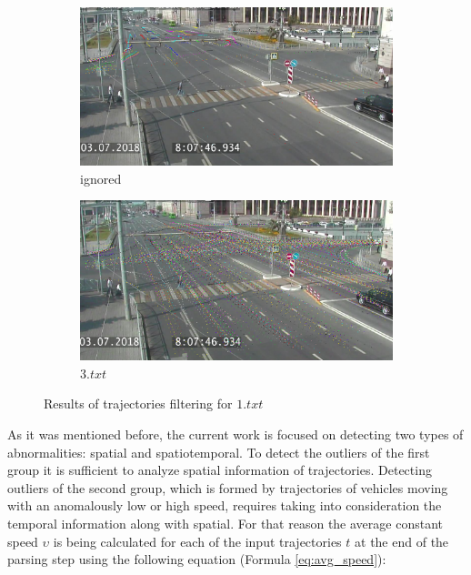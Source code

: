 \begin{figure}
	\centering
	\begin{subfigure}[b]{0.48\textwidth}
		\centering{}
		\includegraphics[width=\textwidth]{images/traj-filter-out.png}
		\caption{ignored}
		\label{fig:traj_filter_out}
	\end{subfigure}
	\hfill
	\begin{subfigure}[b]{0.48\textwidth}
		\centering{}
		\includegraphics[width=\textwidth]{images/traj-filter-keep.png}
		\caption{$3.txt$}
		\label{fig:traj_filter_keep}
	\end{subfigure}
	\caption{Results of trajectories filtering for $1.txt$}
	\label{fig:traj_filter}
\end{figure}

As it was mentioned before, the current work is focused on detecting two types of abnormalities: spatial and spatiotemporal. To detect the outliers of the first group it is sufficient to analyze spatial information of trajectories. Detecting outliers of the second group, which is formed by trajectories of vehicles moving with an anomalously low or high speed, requires taking into consideration the temporal information along with spatial. For that reason the average constant speed $\upsilon$ is being calculated for each of the input trajectories $t$ at the end of the parsing step using the following equation (Formula \ref{eq:avg_speed}):


